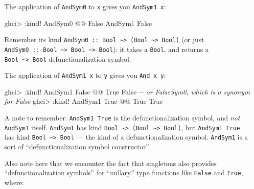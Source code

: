 \documentclass[]{article}
\newenvironment{Shaded}{}{}
\newcommand{\CommentTok}[1]{\textcolor[rgb]{0.38,0.63,0.69}{\textit{#1}}}
\newcommand{\DataTypeTok}[1]{\textcolor[rgb]{0.56,0.13,0.00}{#1}}
\newcommand{\NormalTok}[1]{#1}
\newcommand{\OperatorTok}[1]{\textcolor[rgb]{0.40,0.40,0.40}{#1}}
\begin{document}
The application of \texttt{AndSym0} to \texttt{x} gives you \texttt{AndSym1\ x}:

\begin{Shaded}
\begin{Highlighting}[]
\NormalTok{ghci}\OperatorTok{>} \OperatorTok{:}\NormalTok{kind}\OperatorTok{!} \DataTypeTok{AndSym0} \OperatorTok{@@} \DataTypeTok{\textquotesingle{}False}
\DataTypeTok{AndSym1} \DataTypeTok{\textquotesingle{}False}
\end{Highlighting}
\end{Shaded}

Remember its kind
\texttt{AndSym0\ ::\ Bool\ \textasciitilde{}\textgreater{}\ (Bool\ \textasciitilde{}\textgreater{}\ Bool)}
(or just
\texttt{AndSym0\ ::\ Bool\ \textasciitilde{}\textgreater{}\ Bool\ \textasciitilde{}\textgreater{}\ Bool}):
it takes a \texttt{Bool}, and returns a
\texttt{Bool\ \textasciitilde{}\textgreater{}\ Bool} defunctionalization symbol.

The application of \texttt{AndSym1\ x} to \texttt{y} gives you
\texttt{And\ x\ y}:

\begin{Shaded}
\begin{Highlighting}[]
\NormalTok{ghci}\OperatorTok{>} \OperatorTok{:}\NormalTok{kind}\OperatorTok{!} \DataTypeTok{AndSym1} \DataTypeTok{\textquotesingle{}False} \OperatorTok{@@} \DataTypeTok{\textquotesingle{}True}
\DataTypeTok{\textquotesingle{}False}              \CommentTok{{-}{-} or FalseSym0, which is a synonym for \textquotesingle{}False}
\NormalTok{ghci}\OperatorTok{>} \OperatorTok{:}\NormalTok{kind}\OperatorTok{!} \DataTypeTok{AndSym1} \DataTypeTok{\textquotesingle{}True}  \OperatorTok{@@} \DataTypeTok{\textquotesingle{}True}
\DataTypeTok{\textquotesingle{}True}
\end{Highlighting}
\end{Shaded}

A note to remember: \texttt{AndSym1\ \textquotesingle{}True} is the
defunctionalization symbol, and \emph{not} \texttt{AndSym1} itself.
\texttt{AndSym1} has kind
\texttt{Bool\ -\textgreater{}\ (Bool\ \textasciitilde{}\textgreater{}\ Bool)},
but \texttt{AndSym1\ \textquotesingle{}True} has kind
\texttt{Bool\ \textasciitilde{}\textgreater{}\ Bool} --- the kind of a
defunctionalization symbol. \texttt{AndSym1} is a sort of ``defunctionalization
symbol constructor''.

Also note here that we encounter the fact that singletons also provides
``defunctionalization symbols'' for ``nullary'' type functions like
\texttt{False} and \texttt{True}, where:
\end{document}
